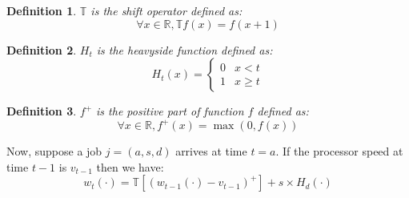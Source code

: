 \documentclass[
10pt, %
a4paper, %
oneside, %
headinclude,footinclude, %
BCOR5mm, %
]{scrartcl}
\newcommand{\T}{\mathbb{T}}
\newcommand{\R}{\mathbb{R}}
\newtheorem{defi}{Definition}
\begin{document}
\begin{defi}
  $\T$ is the shift operator defined as:
  \[ \forall x\in\R,\T f(x) = f(x+1)\]
\end{defi}

\begin{defi}
  $H_t$ is the heavyside function defined as:
  \[ H_t(x) =
    \begin{cases}
      0 & x<t \\
      1 & x\geq t
    \end{cases}
  \]
\end{defi}

\begin{defi}
  $f^+$ is the positive part of function $f$ defined as:
  \[
    \forall x\in\R, f^+(x)=\max(0,f(x))
  \]
\end{defi}

Now, suppose a job $j=(a,s,d)$ arrives at time $t=a$. If the processor
speed at time $t-1$ is $v_{t-1}$ then we have:
\begin{equation}
  \label{eq:nextw}
  w_t(\cdot)=\T[(w_{t-1}(\cdot)-v_{t-1})^+]+s\times H_d(\cdot)
\end{equation}
\end{document}
